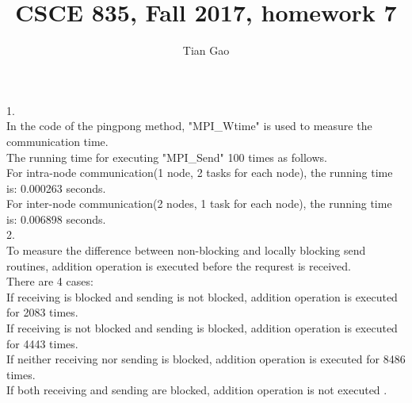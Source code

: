 \documentclass[a4paper]{article}
\title{CSCE 835, Fall 2017, homework 7}
\author{Tian Gao}
\begin{document}
\maketitle


1.\\
In the code of the pingpong method, "MPI\_Wtime" is used to measure the communication time.\\
The running time for executing "MPI\_Send" 100 times as follows.\\
For intra-node	communication(1 node, 2 tasks for each node), the running time is: 0.000263 seconds.\\
For inter-node	communication(2 nodes, 1 task for each node), the running time is: 0.006898 seconds.\\

2.\\
To measure the difference between non-blocking and locally blocking send routines, addition operation is executed before the requrest is received.\\
There are 4 cases: \\
If receiving is blocked and sending is not blocked, addition operation is executed for 2083 times.\\
If receiving is not blocked and sending is blocked, addition operation is executed for 4443 times.\\
If neither receiving nor sending is blocked, addition operation is executed for 8486 times.\\
If both receiving and sending are blocked, addition operation is not executed .\\
\end{document}
